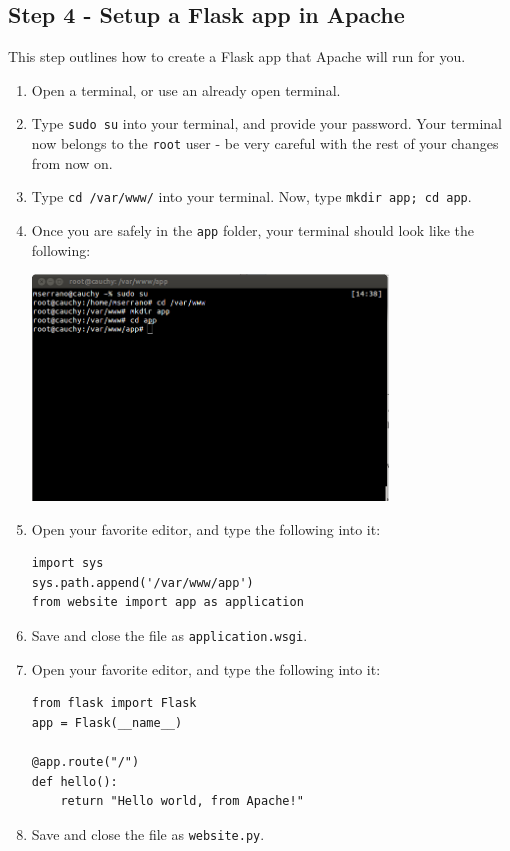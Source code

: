 \documentclass{article}
\begin{document}
\subsection{Step 4 - Setup a Flask app in Apache}
This step outlines how to create a Flask app that Apache will run for you.
\begin{enumerate}
\item Open a terminal, or use an already open terminal.
\item Type \verb+sudo su+ into your terminal, and provide your password. Your terminal
now belongs to the \verb+root+ user - be very careful with the rest of your changes
from now on.
\item Type \verb+cd /var/www/+ into your terminal. Now, type \verb+mkdir app; cd app+.
\item Once you are safely in the \verb+app+ folder, your terminal should look like the following:

\includegraphics[height=6cm]{pic4.png}

\item Open your favorite editor, and type the following into it:
\begin{verbatim}
import sys
sys.path.append('/var/www/app')
from website import app as application
\end{verbatim}
\item Save and close the file as \verb+application.wsgi+.
\item Open your favorite editor, and type the following into it:
\begin{verbatim}
from flask import Flask
app = Flask(__name__)

@app.route("/")
def hello():
    return "Hello world, from Apache!"
\end{verbatim}
\item Save and close the file as \verb+website.py+.
\end{enumerate}
\end{document}
